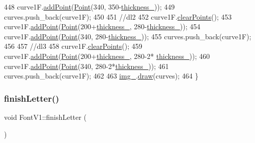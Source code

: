 \begin{DoxyCode}
448     curve1F.\mbox{\hyperlink{class_bezier_curve_a38d16c18b36ae45619b05e26e226cf34}{addPoint}}(\mbox{\hyperlink{class_point}{Point}}(340, 350-\mbox{\hyperlink{class_font_v1_aed8040e76be9a52833627b92f0fb4e5f}{thickness\_}}));
449     curves.push\_back(curve1F);
450 
451     \textcolor{comment}{//dl2}
452     curve1F.\mbox{\hyperlink{class_bezier_curve_a0ba8ce66d5af5971ae6a1b506029728e}{clearPoints}}();
453     curve1F.\mbox{\hyperlink{class_bezier_curve_a38d16c18b36ae45619b05e26e226cf34}{addPoint}}(\mbox{\hyperlink{class_point}{Point}}(200+\mbox{\hyperlink{class_font_v1_aed8040e76be9a52833627b92f0fb4e5f}{thickness\_}}, 280-\mbox{\hyperlink{class_font_v1_aed8040e76be9a52833627b92f0fb4e5f}{thickness\_}}));
454     curve1F.\mbox{\hyperlink{class_bezier_curve_a38d16c18b36ae45619b05e26e226cf34}{addPoint}}(\mbox{\hyperlink{class_point}{Point}}(340, 280-\mbox{\hyperlink{class_font_v1_aed8040e76be9a52833627b92f0fb4e5f}{thickness\_}}));
455     curves.push\_back(curve1F);
456 
457     \textcolor{comment}{//dl3}
458     curve1F.\mbox{\hyperlink{class_bezier_curve_a0ba8ce66d5af5971ae6a1b506029728e}{clearPoints}}();
459     curve1F.\mbox{\hyperlink{class_bezier_curve_a38d16c18b36ae45619b05e26e226cf34}{addPoint}}(\mbox{\hyperlink{class_point}{Point}}(200+\mbox{\hyperlink{class_font_v1_aed8040e76be9a52833627b92f0fb4e5f}{thickness\_}}, 280-2*
      \mbox{\hyperlink{class_font_v1_aed8040e76be9a52833627b92f0fb4e5f}{thickness\_}}));
460     curve1F.\mbox{\hyperlink{class_bezier_curve_a38d16c18b36ae45619b05e26e226cf34}{addPoint}}(\mbox{\hyperlink{class_point}{Point}}(340, 280-2*\mbox{\hyperlink{class_font_v1_aed8040e76be9a52833627b92f0fb4e5f}{thickness\_}}));
461     curves.push\_back(curve1F);
462 
463     \mbox{\hyperlink{class_font_v1_a00569e3e3c4b70f437b63f396f735fb0}{img\_}}.\mbox{\hyperlink{class_image_a8d162f3cab956131d58708c09aa560b0}{draw}}(curves);
464 \}
\end{DoxyCode}
\mbox{\label{class_font_v1_a29e1b96b06056aad8542c3d2ac79ebf2}} 
\subsubsection{\texorpdfstring{finish\+Letter()}{finishLetter()}}
{\footnotesize\ttfamily void Font\+V1\+::finish\+Letter (\begin{DoxyParamCaption}{ }\end{DoxyParamCaption})}



